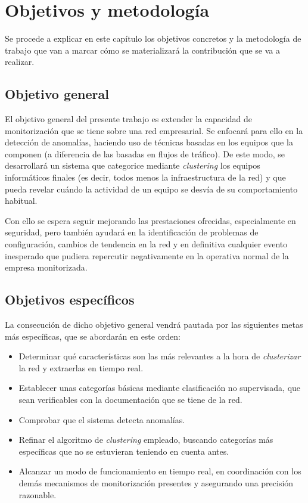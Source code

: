 \chapter{Objetivos y metodología}\label{chap:objetivos}

Se procede a explicar en este capítulo los objetivos concretos y la metodología de trabajo que van a marcar cómo se materializará la contribución que se va a realizar.

\section{Objetivo general}\label{sec:objgeneral}
El objetivo general del presente trabajo es extender la capacidad de monitorización que se tiene sobre una red empresarial.
Se enfocará para ello en la detección de anomalías, haciendo uso de técnicas basadas en los equipos que la componen (a diferencia de las basadas en flujos de tráfico).
De este modo, se desarrollará un sistema que categorice mediante \emph{clustering} los equipos informáticos finales (es decir, todos menos la infraestructura de la red)
y que pueda revelar cuándo la actividad de un equipo se desvía de su comportamiento habitual.

Con ello se espera seguir mejorando las prestaciones ofrecidas, especialmente en seguridad, pero también ayudará en la identificación de problemas de configuración, cambios de tendencia en la red y en definitiva cualquier evento inesperado que pudiera repercutir negativamente en la operativa normal de la empresa monitorizada.

\section{Objetivos específicos}\label{sec:objespecificos}
La consecución de dicho objetivo general vendrá pautada por las siguientes metas más específicas, que se abordarán en este orden:

\begin{itemize}

\item Determinar qué características son las más relevantes a la hora de \emph{clusterizar} la red y extraerlas en tiempo real.

\item Establecer unas categorías básicas mediante clasificación no supervisada, que sean verificables con la documentación que se tiene de la red.

\item Comprobar que el sistema detecta anomalías.

\item Refinar el algoritmo de \emph{clustering} empleado, buscando categorías más específicas que no se estuvieran teniendo en cuenta antes.

\item Alcanzar un modo de funcionamiento en tiempo real, en coordinación con los demás mecanismos de monitorización presentes y asegurando una precisión razonable.

\end{itemize}

